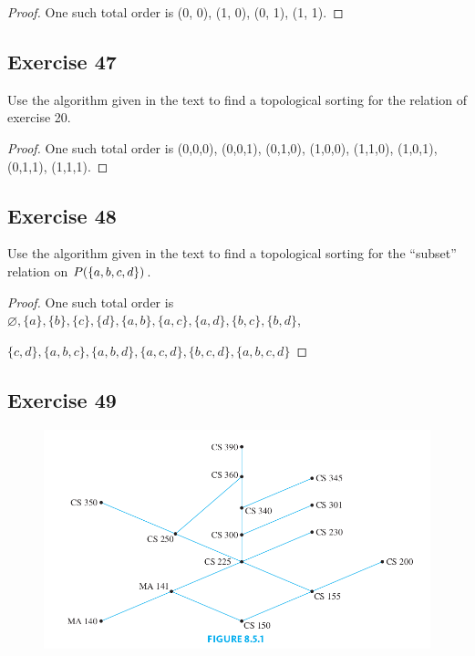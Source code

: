 \documentclass[14pt]{extarticle}
\let\mathscr\relax
\newcommand{\ps}{\mathscr{P}} %
\newcommand{\es}{\varnothing}
\begin{document}
\begin{proof}
        One such total order is (0, 0), (1, 0), (0, 1), (1, 1).
\end{proof}

\subsection{Exercise 47}
Use the algorithm given in the text to find a topological sorting for the relation of exercise 20.

\begin{proof}
        One such total order is (0,0,0), (0,0,1), (0,1,0), (1,0,0), (1,1,0), (1,0,1), (0,1,1), (1,1,1).
\end{proof}

\subsection{Exercise 48}
Use the algorithm given in the text to find a topological sorting for the “subset” relation on \(\ps(\{a, b, c, d\})\).

\begin{proof}
        One such total order is \(\es, \{a\}, \{b\}, \{c\}, \{d\}, \{a,b\}, \{a,c\}, \{a,d\}, \{b,c\}, \{b,d\}\),

        \(\{c,d\}, \{a,b,c\}, \{a,b,d\}, \{a,c,d\}, \{b,c,d\}, \{a,b,c,d\}\)
\end{proof}

\subsection{Exercise 49}
\begin{figure}[ht!]
        \centering
        \includegraphics[scale=0.5]{../images/8.5.1.png}
\end{figure}
\end{document}
